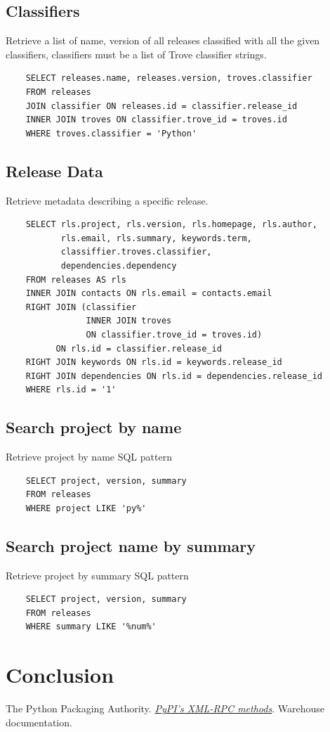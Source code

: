 \documentclass[a4paper,12pt]{article}
\begin{document}
\subsection{Classifiers}
Retrieve a list of name, version of all releases classified with all the given classifiers, classifiers must be a list of Trove classifier strings.
\begin{verbatim}
    SELECT releases.name, releases.version, troves.classifier
    FROM releases
    JOIN classifier ON releases.id = classifier.release_id
    INNER JOIN troves ON classifier.trove_id = troves.id
    WHERE troves.classifier = 'Python'
\end{verbatim}
\subsection{Release Data}
Retrieve metadata describing a specific release.
\begin{verbatim}
    SELECT rls.project, rls.version, rls.homepage, rls.author,
           rls.email, rls.summary, keywords.term,
           classiffier.troves.classifier,
           dependencies.dependency
    FROM releases AS rls
    INNER JOIN contacts ON rls.email = contacts.email
    RIGHT JOIN (classifier
                INNER JOIN troves
                ON classifier.trove_id = troves.id)
          ON rls.id = classifier.release_id
    RIGHT JOIN keywords ON rls.id = keywords.release_id
    RIGHT JOIN dependencies ON rls.id = dependencies.release_id
    WHERE rls.id = '1'

\end{verbatim}
\subsection{Search project by name}
Retrieve project by name SQL pattern
\begin{verbatim}
    SELECT project, version, summary
    FROM releases
    WHERE project LIKE 'py%'
\end{verbatim}
\subsection{Search project name by summary}
Retrieve project by summary SQL pattern
\begin{verbatim}
    SELECT project, version, summary
    FROM releases
    WHERE summary LIKE '%num%'
\end{verbatim}

\section{Conclusion}

\begin{thebibliography}{69}
    The Python Packaging Authority.
    \href{https://warehouse.readthedocs.io/api-reference/xml-rpc}
         {\emph{PyPI’s XML-RPC methods}}.
    Warehouse documentation.
\end{thebibliography}
\end{document}
